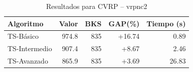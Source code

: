 \begin{table}[h]
\centering
\caption{Resultados para CVRP -- vrpnc2}
\label{tab:vrp_vrpnc2}
\begin{tabular}{lrrrr}
\hline
\textbf{Algoritmo} & \textbf{Valor} & \textbf{BKS} & \textbf{GAP(\%)} & \textbf{Tiempo (s)} \\
\hline
TS-Básico & 974.8 & 835 & +16.74 & 0.89 \\
TS-Intermedio & 907.4 & 835 & +8.67 & 2.46 \\
TS-Avanzado & 865.9 & 835 & +3.69 & 26.83 \\
\hline
\end{tabular}
\end{table}
